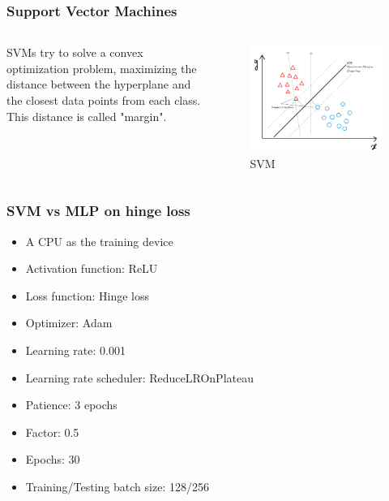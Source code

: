\begin{frame}
    \frametitle{Support Vector Machines}
    \begin{columns}
        \begin{column}{0.5\textwidth} 
        SVMs try to solve a convex optimization problem, maximizing the distance between
        the hyperplane and the closest data points from each class. This distance is called
        "margin".
        \end{column}
        \begin{column}{0.5\textwidth} 
            \begin{figure}
                \centering
                \includegraphics[width=1\textwidth]{media/2ndAssignment/svm_example.png}
                \caption{SVM}
            \end{figure}
        \end{column}
    \end{columns}
\end{frame}

\begin{frame}
    \frametitle{SVM vs MLP on hinge loss}
    \begin{itemize}
        \item A CPU as the training device
        \item Activation function: ReLU
        \item Loss function: Hinge loss
        \item Optimizer: Adam
        \item Learning rate: 0.001
        \item Learning rate scheduler: ReduceLROnPlateau
        \item Patience: 3 epochs
        \item Factor: 0.5
        \item Epochs: 30
        \item Training/Testing batch size: 128/256
    \end{itemize}
\end{frame}

